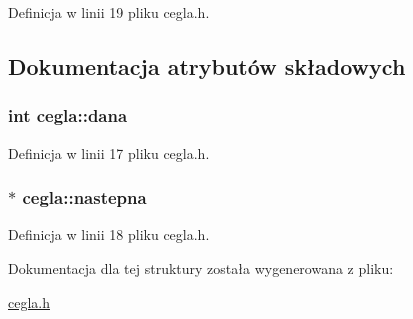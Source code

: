 Definicja w linii 19 pliku cegla.\-h.



\subsection{Dokumentacja atrybutów składowych}
\hypertarget{structcegla_a25ba885f5ac99791f80fd1676ce22a3a}{
\subsubsection[{dana}]{\setlength{\rightskip}{0pt plus 5cm}int cegla\-::dana}}\label{structcegla_a25ba885f5ac99791f80fd1676ce22a3a}


Definicja w linii 17 pliku cegla.\-h.

\hypertarget{structcegla_aca5144299572d01d919e2655e447f9a8}{
\subsubsection[{nastepna}]{$\ast$ cegla\-::nastepna}}\label{structcegla_aca5144299572d01d919e2655e447f9a8}


Definicja w linii 18 pliku cegla.\-h.



Dokumentacja dla tej struktury została wygenerowana z pliku\-:\begin{DoxyCompactItemize}
\item 
\hyperlink{cegla_8h}{cegla.\-h}\end{DoxyCompactItemize}
